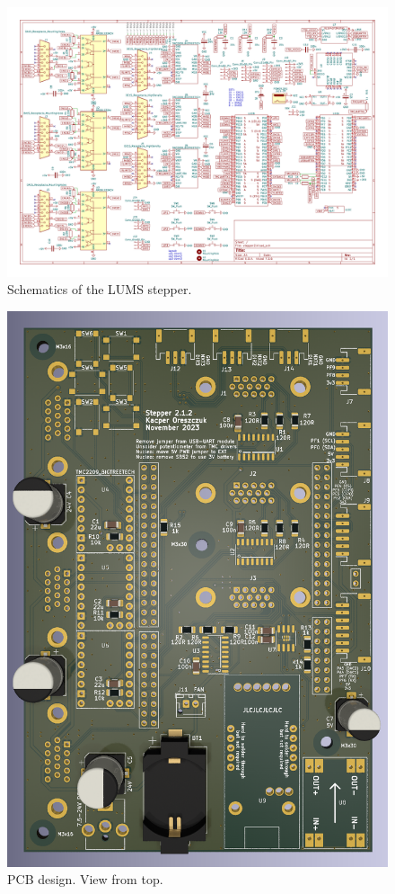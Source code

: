 \documentclass[10pt,article]{article}
\begin{document}
\begin{figure}[h]
 \centering
 \includegraphics[width = \textwidth]{schematics.pdf}
\caption {Schematics of the LUMS stepper.} \label{schematics}
\end{figure}


\begin{figure}[h]
 \centering
 \includegraphics[width = 14cm]{render.png}
\caption {PCB design. View from top.} \label{pcb}
\end{figure}
\end{document}
